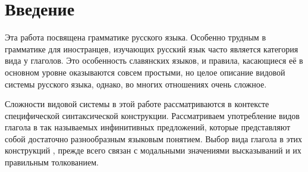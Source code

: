 \section{Введение}

Эта работа посвящена грамматике русского языка. Особенно трудным в грамматике для иностранцев, изучающих русский язык часто является категория вида у глаголов. Это особенность славянских языков, и правила, касающиеся её в основном уровне оказываются совсем простыми, но целое описание видовой системы русского языка, однако, во многих отношениях очень сложное. 

Сложности видовой системы в этой работе рассматриваются в контексте специфической синтаксической конструкции. Рассматриваем употребление видов глагола в так называемых инфинитивных предложений, которые представляют собой достаточно разнообразным языковым понятием. Выбор вида глагола в этих конструкций , прежде всего связан с модальными значениями высказываний и их правильным толкованием.

%
%

